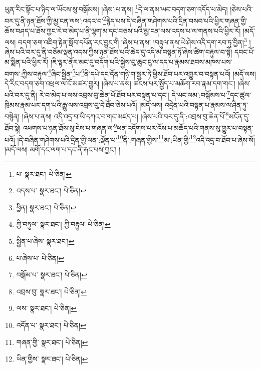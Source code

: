 ཡུན་རིང་སྟོང་པ་ཉིད་ལ་ཡོངས་སུ་བསྒོམས། །ཞེས་:པ་ནས། \footnote{པ་  སྣར་ཐང་།  པེ་ཅིན། }དེ་ལ་ནམ་ཡང་བདག་ཅག་འདོད་པ་མེད། །ཅེས་པའི་བར་དུ་ནི་ཉན་ཐོས་ཀྱི་མྱ་ངན་ལས་:འདའ་བ་\footnote{འདས་པ་  སྣར་ཐང་།  པེ་ཅིན། }རྙེད་པས་དེ་བཞིན་གཤེགས་པའི་དྲིན་བསབ་པའི་ཕྱིར་གཞན་གྱི་ཆོས་བཤད་པ་ཐོས་ཀྱང་རེ་བ་མེད་པ་ནི་ལྷག་མ་དང་བཅས་པའི་མྱ་ངན་ལས་འདས་པ་ལ་གནས་པའི་ཕྱིར་རོ། །མདོ་ལས། བདག་ཅག་འཇིག་རྟེན་སློབ་དཔོན་རང་བྱུང་གི །ཞེས་པ་ནས། །བརྟུལ་ནས་ཡེ་ཤེས་འདི་དག་རབ་ཏུ་བྱིན།\footnote{ཕྱིན།  སྣར་ཐང་།  པེ་ཅིན། } །ཞེས་པའི་བར་དུ་ནི་བཅོམ་ལྡན་འདས་ཀྱིས་ཉན་ཐོས་པའི་ཆེད་དུ་འདི་མ་བསྟན་ཏོ་ཞེས་ཚིག་བརྟུལ་བ་སྟེ། དབང་པོ་མ་སྨིན་པའི་ཕྱིར་རོ། །ཇི་ལྟར་ནོར་མང་དུ་བདོག་པའི་སྐྱེས་བུ་ཆུང་ངུ་ལ་དད་པ་རྣམས་ཐབས་མཁས་པས་བགས་:ཀྱིས་བརྟུལ་\footnote{ཀྱི་བཏུལ་  སྣར་ཐང་། ཀྱི་བརྟུལ་  པེ་ཅིན། }ཞིང་སྦྱིན་\footnote{སྦྱིན་པ་ཞེས་  སྣར་ཐང་། }པ་\footnote{པ་ཞེས་པ་  པེ་ཅིན། }ནི་དཔེ་དང་དོན་གཉི་ག་སྦྱར་ཏེ་ཕྱིས་ཐོབ་པར་འགྱུར་བ་བསྟན་པའོ། །མདོ་ལས། དེ་རིང་བདག་ཅག་འཕྲལ་ལ་ངོ་མཚར་གྱུར། །ཞེས་པ་ནས། ཚངས་པར་སྤྱོད་པ་མཆོག་རབ་རྣམ་དག་གང་། །ཞེས་པའི་བར་དུ་ནི། རེ་བ་མེད་པ་ལས་འབྲས་བུ་ཆེན་པོ་ཐོབ་པར་བསྟན་པ་དང་། དེ་ཡང་ལམ་:བསྒོམས་པ་\footnote{བསྒོམ་པ་  སྣར་ཐང་།  པེ་ཅིན། }དང་ཚུལ་ཁྲིམས་རྣམ་པར་དག་པའི་རྒྱུ་ལས་འབྲས་བུ་དེ་ཐོབ་ཅེས་པའོ། །མདོ་ལས། འདྲེན་པའི་བསྟན་པ་རྣམས་ལ་ཤིན་ཏུ་བསྙེན། །ཞེས་པ་ནས། འདི་འདྲ་བ་ཡི་དཀའ་བ་གང་མཛད་པ། །ཞེས་པའི་བར་དུ་ནི་:འབྲས་བུ་ཆེན་པོ་\footnote{འབྲས་བུ་  སྣར་ཐང་།  པེ་ཅིན། }མངོན་དུ་ཐོབ་སྟེ། འཕགས་པ་ཉན་ཐོས་སུ་ངེས་པ་གཞན་ལ་\footnote{ལས་  སྣར་ཐང་།  པེ་ཅིན། }ཕན་འདོགས་པར་འོས་པ་མཆོད་པའི་གནས་སུ་གྱུར་པ་བསྟན་པའོ། །དེ་བཞིན་གཤེགས་པའི་དྲིན་གྱི་ལན་:ལྡོན་པ་\footnote{འདོན་པ་  སྣར་ཐང་།  པེ་ཅིན། }ནི་:གཞན་གྱིས་\footnote{གཞན་གྱི་  སྣར་ཐང་།  པེ་ཅིན། }མ་:ཡིན་གྱི་\footnote{ཡིན་གྱིས་  སྣར་ཐང་།  པེ་ཅིན། }འདི་འདྲ་བ་ཐོབ་པ་ཞེས་སོ། །མདོ་ལས། མགོ་དང་ལག་པ་དང་ནི་རྐང་པས་ཀྱང་། །
